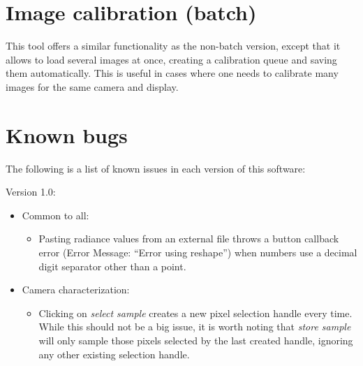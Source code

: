 \documentclass[a4paper,12pt,oneside]{article}
\begin{document}
\section{Image calibration (batch)}

This tool offers a similar functionality as the non-batch version, except that it allows to load several images at once, creating a calibration queue and saving them automatically. This is useful in cases where one needs to calibrate many images for the same camera and display.


\section{Known bugs}
The following is a list of known issues in each version of this software:

Version 1.0:

\begin{itemize}
	\item Common to all:
	\begin{itemize}
		\item 
		Pasting radiance values from an external file throws a button callback error (Error Message: ``Error using reshape'') when numbers use a decimal digit separator other than a point.
	\end{itemize}
	\item Camera characterization:
	\begin{itemize}
		\item 
		Clicking on \textit{select sample} creates a new pixel selection handle every time. While this should not be a big issue, it is worth noting that \textit{store sample} will only sample those pixels selected by the last created handle, ignoring any other existing selection handle.
	\end{itemize}
\end{itemize}
\end{document}
